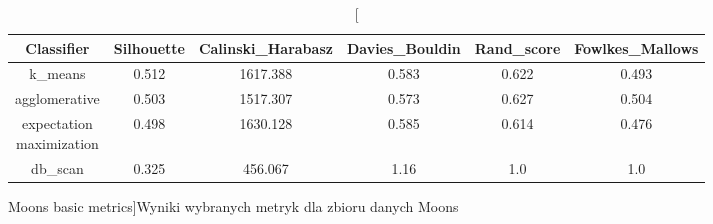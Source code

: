 \documentclass{classrep}
\begin{document}
{{            \begin{table}[!htbp]
            \begin{adjustbox}{minipage=20cm, center}
            \centering
            \begin{tabular}{|c|c|c|c|c|c|}
            \hline
            Classifier & Silhouette & Calinski\_Harabasz & Davies\_Bouldin & Rand\_score & Fowlkes\_Mallows \\ \hline
            k\_means & 0.512 & 1617.388 & 0.583 & 0.622 & 0.493 \\ \hline
            agglomerative & 0.503 & 1517.307 & 0.573 & 0.627 & 0.504 \\ \hline
            \makecell{ expectation\\maximization} & 0.498 & 1630.128 & 0.585 & 0.614 & 0.476 \\ \hline
            db\_scan & 0.325 & 456.067 & 1.16 & 1.0 & 1.0 \\ \hline
            \end{tabular}
            \caption
            [Moons basic metrics]{Wyniki wybranych metryk dla zbioru danych Moons}
            \label{Moons_basic_metrics}
            \end{adjustbox}
            \end{table}
            \FloatBarrier
        }

    }
\end{document}

